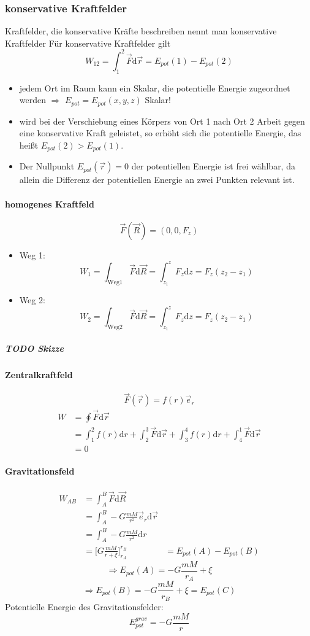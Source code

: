 \documentclass[a4paper]{scrartcl}
\renewcommand{\d}{\mathrm{d}}
\renewcommand{\v}[1]{\vec{#1}}
\theoremstyle{definition}
\theoremstyle{plain}
\theoremstyle{plain}
\theoremstyle{remark}
\theoremstyle{remark}
\theoremstyle{remark}
\begin{document}
\subsubsection{konservative Kraftfelder}
\label{sec-4-9-4}
Kraftfelder, die konservative Kräfte beschreiben nennt man konservative Kraftfelder
Für konservative Kraftfelder gilt
\[W_{12} = \int_1^2\v F\d\v r = E_{pot}(1) - E_{pot}(2)\]
\begin{itemize}
\item jedem Ort im Raum kann ein Skalar, die potentielle Energie zugeordnet werden $\Rightarrow$ $E_{pot} = E_{pot}(x,y,z)$ Skalar!
\item wird bei der Verschiebung eines Körpers von Ort 1 nach Ort 2 Arbeit gegen eine konservative Kraft geleistet, so erhöht sich die potentielle Energie, das heißt $E_{pot}(2) > E_{pot}(1)$.
\item Der Nullpunkt $E_{pot}(\v r) = 0$ der potentiellen Energie ist frei wählbar, da allein die Differenz der potentiellen Energie an zwei Punkten relevant ist.
\end{itemize}
\paragraph{homogenes Kraftfeld}
\label{sec-4-9-4-1}
\[\v F(\v R) = (0,0,F_z)\]
\begin{itemize}
\item Weg 1: \[W_1 = \int_{\text{Weg1}}\v F\d \v R = \int_{z_1}^z F_z\d z = F_z(z_2 - z_1)\]
\item Weg 2: \[W_2 = \int_{\text{Weg2}}\v F\d \v R = \int_{z_1}^z F_z\d z = F_z(z_2 - z_1)\]
\end{itemize}
\subparagraph{{\bfseries\sffamily TODO} Skizze}
\label{sec-4-9-4-1-1}
\paragraph{Zentralkraftfeld}
\label{sec-4-9-4-2}
\[\v F(\v r) = f(r)\v e_r\]
\begin{align}
W &= \oint\v F\d \v r \\
&= \int_1^2 f(r)\d r + \int_2^3 \v F\d \v r + \int_3^4 f(r)\d r + \int_4^1 \v F\d \v r \\
&= 0
\end{align}
\paragraph{Gravitationsfeld}
\label{sec-4-9-4-3}
\begin{align}
W_{AB} &= \int_A^B\v F\d \v R \\
&= \int_A^B -G\frac{mM}{r^2}\v e_r\d\v r \\
&= \int_A^B -G\frac{mM}{r^2}\d r \\
&= \Big[G\frac{mM}{r + \xi}\Big]_{r_A}^{r_B}
&= E_{pot}(A) - E_{pot}(B)
\end{align}
\[\Rightarrow E_{pot}(A) = -G\frac{mM}{r_A} + \xi\]
\[\Rightarrow E_{pot}(B) = -G\frac{mM}{r_B} + \xi = E_{pot}(C)\]
Potentielle Energie des Gravitationsfelder:
\[E_{pot}^{grav} = -G\frac{mM}{r}\]
\end{document}

